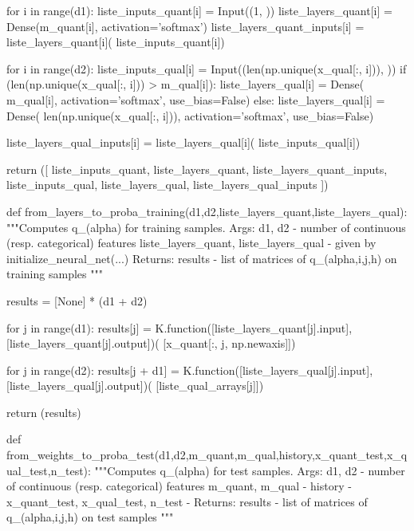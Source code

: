 \begin{pylisting}
        for i in range(d1):
            liste_inputs_quant[i] = Input((1, ))
            liste_layers_quant[i] = Dense(m_quant[i], activation='softmax')
            liste_layers_quant_inputs[i] = liste_layers_quant[i](
                liste_inputs_quant[i])

        for i in range(d2):
            liste_inputs_qual[i] = Input((len(np.unique(x_qual[:, i])), ))
            if (len(np.unique(x_qual[:, i])) > m_qual[i]):
                liste_layers_qual[i] = Dense(
                m_qual[i], activation='softmax', use_bias=False)
            else:
                liste_layers_qual[i] = Dense(
                len(np.unique(x_qual[:, i])), activation='softmax', use_bias=False)

            liste_layers_qual_inputs[i] = liste_layers_qual[i](
                liste_inputs_qual[i])

        return ([
            liste_inputs_quant, liste_layers_quant, liste_layers_quant_inputs,
            liste_inputs_qual, liste_layers_qual, liste_layers_qual_inputs
        ])
    
    
    def from_layers_to_proba_training(d1,d2,liste_layers_quant,liste_layers_qual):
        """Computes q_(alpha) for training samples.
	    Args:
	       d1, d2 - number of continuous (resp. categorical) features
	       liste_layers_quant, liste_layers_qual - given by initialize_neural_net(...)
	    Returns:
			results - list of matrices of q_(alpha,i,j,h) on training samples
	    """

        results = [None] * (d1 + d2)

        for j in range(d1):
            results[j] = K.function([liste_layers_quant[j].input],
                                    [liste_layers_quant[j].output])(
                                        [x_quant[:, j, np.newaxis]])

        for j in range(d2):
            results[j + d1] = K.function([liste_layers_qual[j].input],
                                         [liste_layers_qual[j].output])(
                                             [liste_qual_arrays[j]])

        return (results)
    
    
    
    
    def from_weights_to_proba_test(d1,d2,m_quant,m_qual,history,x_quant_test,x_qual_test,n_test):
        """Computes q_(alpha) for test samples.
	    Args:
	       d1, d2 - number of continuous (resp. categorical) features
	       m_quant, m_qual - 
	       history - 
	       x_quant_test, x_qual_test, n_test - 
	    Returns:
			results - list of matrices of q_(alpha,i,j,h) on test samples
	    """
	    

\end{pylisting}
